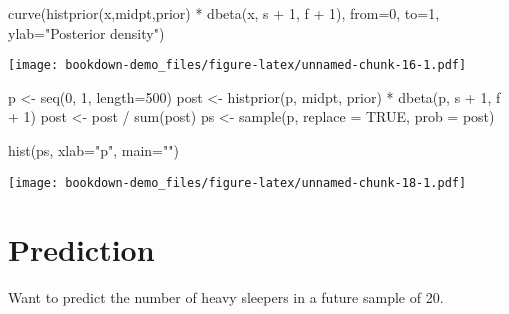 \documentclass[
]{book}
\newenvironment{Shaded}{\begin{snugshade}}{\end{snugshade}}
\newcommand{\AttributeTok}[1]{\textcolor[rgb]{0.77,0.63,0.00}{#1}}
\newcommand{\ConstantTok}[1]{\textcolor[rgb]{0.00,0.00,0.00}{#1}}
\newcommand{\DecValTok}[1]{\textcolor[rgb]{0.00,0.00,0.81}{#1}}
\newcommand{\FunctionTok}[1]{\textcolor[rgb]{0.00,0.00,0.00}{#1}}
\newcommand{\NormalTok}[1]{#1}
\newcommand{\OtherTok}[1]{\textcolor[rgb]{0.56,0.35,0.01}{#1}}
\newcommand{\SpecialCharTok}[1]{\textcolor[rgb]{0.00,0.00,0.00}{#1}}
\newcommand{\StringTok}[1]{\textcolor[rgb]{0.31,0.60,0.02}{#1}}
\begin{document}
\begin{Shaded}
\begin{Highlighting}[]
\FunctionTok{curve}\NormalTok{(}\FunctionTok{histprior}\NormalTok{(x,midpt,prior) }\SpecialCharTok{*} 
        \FunctionTok{dbeta}\NormalTok{(x, s }\SpecialCharTok{+} \DecValTok{1}\NormalTok{, f }\SpecialCharTok{+} \DecValTok{1}\NormalTok{), }
   \AttributeTok{from=}\DecValTok{0}\NormalTok{, }\AttributeTok{to=}\DecValTok{1}\NormalTok{, }\AttributeTok{ylab=}\StringTok{"Posterior density"}\NormalTok{)}
\end{Highlighting}
\end{Shaded}

\texttt{[image: bookdown-demo\_files/figure-latex/unnamed-chunk-16-1.pdf]}

\begin{Shaded}
\begin{Highlighting}[]
\NormalTok{p }\OtherTok{\textless{}{-}} \FunctionTok{seq}\NormalTok{(}\DecValTok{0}\NormalTok{, }\DecValTok{1}\NormalTok{, }\AttributeTok{length=}\DecValTok{500}\NormalTok{)}
\NormalTok{post }\OtherTok{\textless{}{-}} \FunctionTok{histprior}\NormalTok{(p, midpt, prior) }\SpecialCharTok{*}
        \FunctionTok{dbeta}\NormalTok{(p, s }\SpecialCharTok{+} \DecValTok{1}\NormalTok{, f }\SpecialCharTok{+} \DecValTok{1}\NormalTok{)}
\NormalTok{post }\OtherTok{\textless{}{-}}\NormalTok{ post }\SpecialCharTok{/} \FunctionTok{sum}\NormalTok{(post)}
\NormalTok{ps }\OtherTok{\textless{}{-}} \FunctionTok{sample}\NormalTok{(p, }\AttributeTok{replace =} \ConstantTok{TRUE}\NormalTok{, }\AttributeTok{prob =}\NormalTok{ post)}
\end{Highlighting}
\end{Shaded}

\begin{Shaded}
\begin{Highlighting}[]
\FunctionTok{hist}\NormalTok{(ps, }\AttributeTok{xlab=}\StringTok{"p"}\NormalTok{, }\AttributeTok{main=}\StringTok{""}\NormalTok{)}
\end{Highlighting}
\end{Shaded}

\texttt{[image: bookdown-demo\_files/figure-latex/unnamed-chunk-18-1.pdf]}

\hypertarget{prediction}{%
\section{Prediction}\label{prediction}}

Want to predict the number of heavy sleepers in a future sample of 20.
\end{document}
